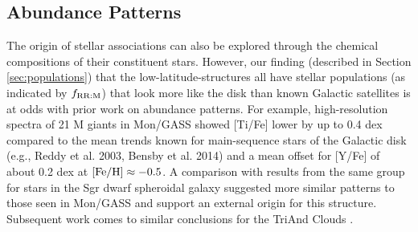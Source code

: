 \documentclass[galaxies,article,submit,moreauthors,pdftex,10pt,a4paper]{mdpi}
\begin{document}

\subsection{Abundance Patterns}

\label{sec:abundances}

The origin of stellar associations can also be explored through the chemical compositions of their constituent stars.
However, our finding (described in Section \ref{sec:populations}) that the low-latitude-structures all have stellar populations (as indicated by $f_{\rm RR:M}$) that look more like the disk than known Galactic satellites is at odds with prior work on abundance patterns.
For example, high-resolution spectra of 21 M giants in Mon/GASS \cite{chou2010b} showed
[Ti/Fe] lower by up to 0.4 dex compared to the mean trends known for main-sequence stars of the Galactic disk (e.g., Reddy et al. 2003, Bensby et al. 2014) and a mean offset for [Y/Fe] of about 0.2 dex at ${\rm [Fe/H]} \approx -0.5$. A comparison with results from the same group for stars in the Sgr dwarf spheroidal galaxy \cite{chou2010a} suggested more similar patterns to those seen in Mon/GASS and support  an external origin for this structure. Subsequent work comes to similar conclusions for the TriAnd Clouds \cite{chou11}.

\end{document}
